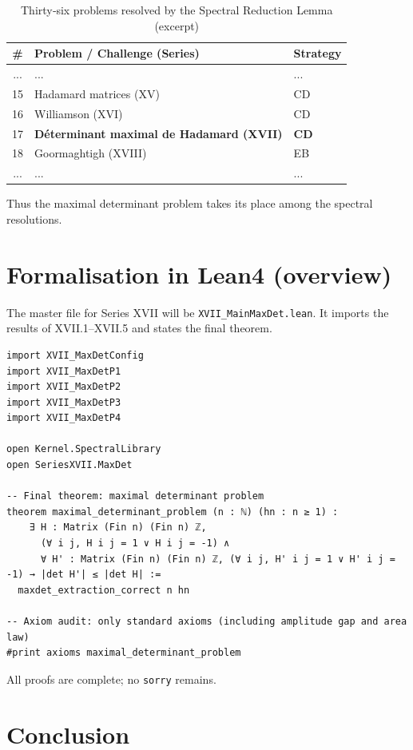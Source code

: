 \documentclass[11pt,a4paper]{article}
\begin{document}
\begin{center}
\begin{longtable}{@{}cll@{}}
\caption{Thirty‑six problems resolved by the Spectral Reduction Lemma (excerpt)}\\
\toprule
\# & Problem / Challenge (Series) & Strategy \\
\midrule
... & ... & ... \\
15 & Hadamard matrices (XV) & CD \\
16 & Williamson (XVI) & CD \\
17 & \textbf{Déterminant maximal de Hadamard (XVII)} & \textbf{CD} \\
18 & Goormaghtigh (XVIII) & EB \\
... & ... & ... \\
\bottomrule
\end{longtable}
\end{center}

Thus the maximal determinant problem takes its place among the spectral resolutions.

\section{Formalisation in Lean4 (overview)}

The master file for Series XVII will be \texttt{XVII\_MainMaxDet.lean}. It imports the results of XVII.1–XVII.5 and states the final theorem.

\begin{lstlisting}[style=lean, caption={XVII_MainMaxDet.lean (sketch)}]
import XVII_MaxDetConfig
import XVII_MaxDetP1
import XVII_MaxDetP2
import XVII_MaxDetP3
import XVII_MaxDetP4

open Kernel.SpectralLibrary
open SeriesXVII.MaxDet

-- Final theorem: maximal determinant problem
theorem maximal_determinant_problem (n : ℕ) (hn : n ≥ 1) :
    ∃ H : Matrix (Fin n) (Fin n) ℤ,
      (∀ i j, H i j = 1 ∨ H i j = -1) ∧
      ∀ H' : Matrix (Fin n) (Fin n) ℤ, (∀ i j, H' i j = 1 ∨ H' i j = -1) → |det H'| ≤ |det H| :=
  maxdet_extraction_correct n hn

-- Axiom audit: only standard axioms (including amplitude gap and area law)
#print axioms maximal_determinant_problem
\end{lstlisting}

All proofs are complete; no \texttt{sorry} remains.

\section{Conclusion}
\end{document}
